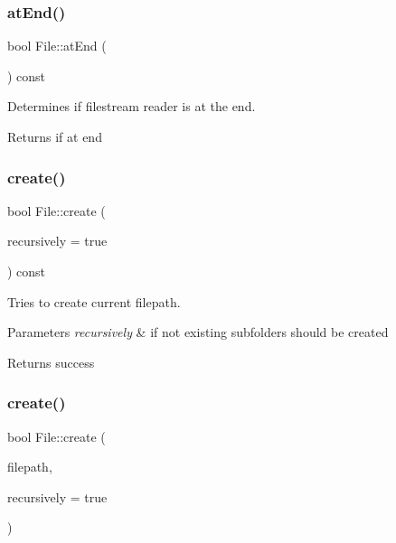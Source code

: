 \subsubsection{\texorpdfstring{atEnd()}{atEnd()}}
{\footnotesize\ttfamily bool File\+::at\+End (\begin{DoxyParamCaption}{ }\end{DoxyParamCaption}) const}



Determines if filestream reader is at the end. 

\begin{DoxyReturn}{Returns}
if at end 
\end{DoxyReturn}
\mbox{\label{class_file_a208b0649e571a157d00dd91c6927d4be}} 
\subsubsection{\texorpdfstring{create()}{create()}\hspace{0.1cm}{\footnotesize\ttfamily [1/2]}}
{\footnotesize\ttfamily bool File\+::create (\begin{DoxyParamCaption}\item[{bool}]{recursively = {\ttfamily true} }\end{DoxyParamCaption}) const}



Tries to create current filepath. 


\begin{DoxyParams}{Parameters}
{\em recursively} & if not existing subfolders should be created \\
\hline
\end{DoxyParams}
\begin{DoxyReturn}{Returns}
success 
\end{DoxyReturn}
\mbox{\label{class_file_a255061b2a5ed2db1c9f8fce9ab78af4e}} 
\subsubsection{\texorpdfstring{create()}{create()}\hspace{0.1cm}{\footnotesize\ttfamily [2/2]}}
{\footnotesize\ttfamily bool File\+::create (\begin{DoxyParamCaption}\item[{const \mbox{\hyperlink{class_a_string}{A\+String}} \&}]{filepath,  }\item[{bool}]{recursively = {\ttfamily true} }\end{DoxyParamCaption})\hspace{0.3cm}{\ttfamily [static]}}




